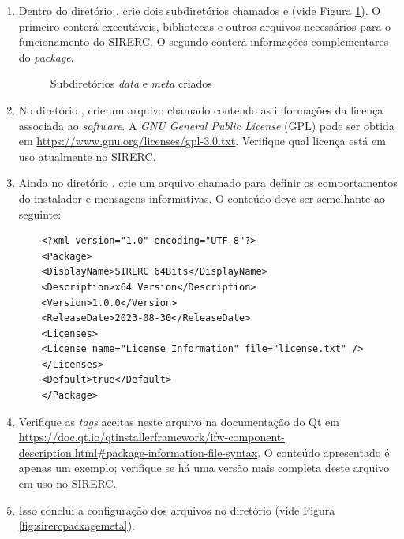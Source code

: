 \documentclass[a4paper,11pt]{article}
\newcommand{\sistema}{\textsf{SIRERC}}
\newcommand{\gnu}{\textit{GNU General Public License}}
\begin{document}
\begin{enumerate}
\begin{enumerate}
		\item Dentro do diretório , crie dois subdiretórios chamados  e  (vide Figura \ref{fig:sirercpackagedirs}). O primeiro conterá executáveis, bibliotecas e outros arquivos necessários para o funcionamento do \sistema{}. O segundo conterá informações complementares do \emph{package}.
		
		\begin{figure}[H]\centering
			\caption{Subdiretórios \emph{data} e \emph{meta} criados}\label{fig:sirercpackagedirs}
		\end{figure}
		
		\item No diretório , crie um arquivo chamado  contendo as informações da licença associada ao \emph{software}. A \emph{\gnu{}} (GPL) pode ser obtida em \url{https://www.gnu.org/licenses/gpl-3.0.txt}. Verifique qual licença está em uso atualmente no \sistema{}.
		
		\item Ainda no diretório , crie um arquivo chamado  para definir os comportamentos do instalador e mensagens informativas. O conteúdo deve ser semelhante ao seguinte:
		
\begin{lstlisting}
	<?xml version="1.0" encoding="UTF-8"?>
	<Package>
	<DisplayName>SIRERC 64Bits</DisplayName>
	<Description>x64 Version</Description>
	<Version>1.0.0</Version>
	<ReleaseDate>2023-08-30</ReleaseDate>
	<Licenses>
	<License name="License Information" file="license.txt" />
	</Licenses>
	<Default>true</Default>
	</Package>
\end{lstlisting}

		
		\item Verifique as \emph{tags} aceitas neste arquivo na documentação do Qt em \url{https://doc.qt.io/qtinstallerframework/ifw-component-description.html#package-information-file-syntax}. O conteúdo apresentado é apenas um exemplo; verifique se há uma versão mais completa deste arquivo em uso no \sistema{}.
		
		\item Isso conclui a configuração dos arquivos no diretório  (vide Figura \ref{fig:sirercpackagemeta}).
		

\end{enumerate}
\end{enumerate}
\end{document}
